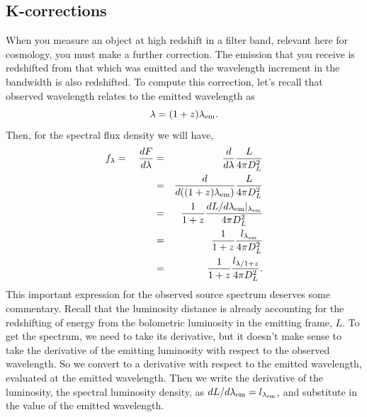 \subsection{K-corrections}
When you measure an object at high redshift in a filter band, relevant here for cosmology, you must make a further correction.  The emission that you receive is redshifted from that which was emitted and the wavelength increment in the bandwidth is also redshifted.  To compute this correction, let's recall that observed wavelength relates to the emitted wavelength as
\begin{equation}
  \lambda = (1+z) \lambda_{\rm em}.
\end{equation}
Then, for the spectral flux density we will have,
\begin{eqnarray}
  f_\lambda = \quad \frac{dF}{d\lambda} &=& \frac{d}{d\lambda} \frac{L}{4\pi D_L^2} \\
  &=& \frac{d}{d ((1+z) \lambda_{\rm em})} \frac{L}{4\pi D_L^2} \\
  &=& \frac{1}{1+z} \frac{dL/d\lambda_{\rm em} |_{\lambda_{\rm em}} }{4\pi D_L^2} \\
  &=& \frac{1}{1+z} \frac{l_{\lambda_{\rm em}} }{4\pi D_L^2} \\
  &=& \frac{1}{1+z} \frac{l_{\lambda/1+z}}{4\pi D_L^2}.
\end{eqnarray}
This important expression for the observed source spectrum deserves some commentary.  Recall that the luminosity distance is already accounting for the redshifting of energy from the bolometric luminosity in the emitting frame, $L$.  To get the spectrum, we need to take its derivative, but it doesn't make sense to take the derivative of the emitting luminosity with respect to the observed wavelength.  So we convert to a derivative with respect to the emitted wavelength, evaluated at the emitted wavelength.  Then we write the derivative of the luminosity, the spectral luminosity density, as $dL/d\lambda_{\rm em} = l_{\lambda_{\rm em}}$, and substitute in the value of the emitted wavelength.

